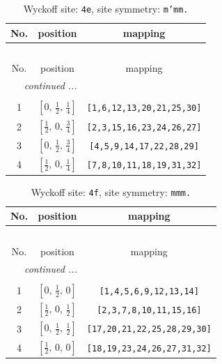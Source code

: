 \documentclass[fleqn,8pt]{jsarticle}
\begin{document}
\begin{longtable}{ccc}
\caption{Wyckoff site: {\tt 4e}, site symmetry: {\tt m'mm.}}
 \\
 \hline \hline
No. & position & mapping \\ \hline \endfirsthead

\multicolumn{2}{l}{\tablename\ \thetable{}} \\
 \hline \hline
No. & position & mapping \\ \hline \endhead

 \hline \hline
\multicolumn{2}{r}{\footnotesize\it continued ...} \\ \endfoot

 \hline \hline
\multicolumn{2}{r}{} \\ \endlastfoot

1 & $\left[ 0,\, \frac{1}{2},\, \frac{1}{4} \right]$ & {\tt [1,6,12,13,20,21,25,30]} \\ \hline
2 & $\left[ \frac{1}{2},\, 0,\, \frac{3}{4} \right]$ & {\tt [2,3,15,16,23,24,26,27]} \\ \hline
3 & $\left[ 0,\, \frac{1}{2},\, \frac{3}{4} \right]$ & {\tt [4,5,9,14,17,22,28,29]} \\ \hline
4 & $\left[ \frac{1}{2},\, 0,\, \frac{1}{4} \right]$ & {\tt [7,8,10,11,18,19,31,32]} \\
\end{longtable}
\renewcommand{\arraystretch}{1.2}
\begin{longtable}{ccc}
\caption{Wyckoff site: {\tt 4f}, site symmetry: {\tt mmm.}}
 \\
 \hline \hline
No. & position & mapping \\ \hline \endfirsthead

\multicolumn{2}{l}{\tablename\ \thetable{}} \\
 \hline \hline
No. & position & mapping \\ \hline \endhead

 \hline \hline
\multicolumn{2}{r}{\footnotesize\it continued ...} \\ \endfoot

 \hline \hline
\multicolumn{2}{r}{} \\ \endlastfoot

1 & $\left[ 0,\, \frac{1}{2},\, 0 \right]$ & {\tt [1,4,5,6,9,12,13,14]} \\ \hline
2 & $\left[ \frac{1}{2},\, 0,\, \frac{1}{2} \right]$ & {\tt [2,3,7,8,10,11,15,16]} \\ \hline
3 & $\left[ 0,\, \frac{1}{2},\, \frac{1}{2} \right]$ & {\tt [17,20,21,22,25,28,29,30]} \\ \hline
4 & $\left[ \frac{1}{2},\, 0,\, 0 \right]$ & {\tt [18,19,23,24,26,27,31,32]} \\
\end{longtable}
\end{document}
